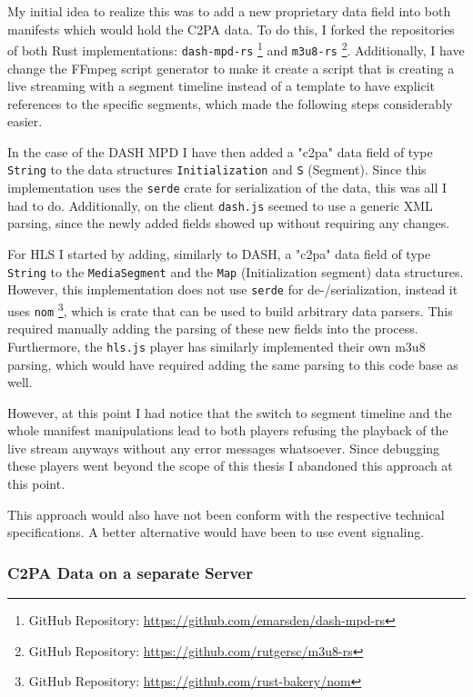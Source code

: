 My initial idea to realize this was to add a new proprietary data field into both manifests which would hold the C2PA data. To do this, I forked the repositories of both Rust implementations: \texttt{dash-mpd-rs} \footnote{GitHub Repository: \url{https://github.com/emarsden/dash-mpd-rs}} and \texttt{m3u8-rs} \footnote{GitHub Repository: \url{https://github.com/rutgersc/m3u8-rs}}. Additionally, I have change the FFmpeg script generator to make it create a script that is creating a live streaming with a segment timeline instead of a template to have explicit references to the specific segments, which made the following steps considerably easier.

In the case of the DASH MPD I have then added a "c2pa" data field of type \texttt{String} to the data structures \texttt{Initialization} and \texttt{S} (Segment). Since this implementation uses the \texttt{serde} crate for serialization of the data, this was all I had to do. Additionally, on the client \texttt{dash.js} seemed to use a generic XML parsing, since the newly added fields showed up without requiring any changes.

For HLS I started by adding, similarly to DASH, a "c2pa" data field of type \texttt{String} to the \texttt{MediaSegment} and the \texttt{Map} (Initialization segment) data structures. However, this implementation does not use \texttt{serde} for de-/serialization, instead it uses \texttt{nom} \footnote{GitHub Repository: \url{https://github.com/rust-bakery/nom}}, which is crate that can be used to build arbitrary data parsers. This required manually adding the parsing of these new fields into the process. Furthermore, the \texttt{hls.js} player has similarly implemented their own m3u8 parsing, which would have required adding the same parsing to this code base as well.

However, at this point I had notice that the switch to segment timeline and the whole manifest manipulations lead to both players refusing the playback of the live stream anyways without any error messages whatsoever. Since debugging these players went beyond the scope of this thesis I abandoned this approach at this point. 

This approach would also have not been conform with the respective technical specifications. A better alternative would have been to use event signaling. 

\subsubsection{C2PA Data on a separate Server\label{sec:on_server}}

